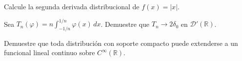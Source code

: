 \begin{exercise}
Calcule la segunda derivada distribucional de $f(x)=|x|$.
\end{exercise}

\begin{exercise}
Sea $T_n(\varphi)=n\int_{-1/n}^{1/n}\varphi(x)\,dx$. Demuestre que $T_n\to 2\delta_0$ en $\mathcal{D}'(\mathbb{R})$.
\end{exercise}

\begin{problem}
Demuestre que toda distribución con soporte compacto puede extenderse a un funcional lineal continuo sobre $C^{\infty}(\mathbb{R})$.
\end{problem}

